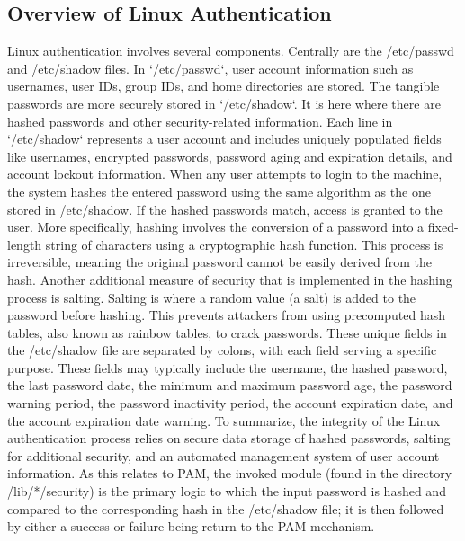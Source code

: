 \documentclass[
]{article}
\begin{document}
\begin{multicols}{2}
\section{Overview of Linux Authentication}
Linux authentication involves several components. Centrally are the /etc/passwd and /etc/shadow files. In `/etc/passwd`, user account information such as usernames, user IDs, group IDs, and home directories are stored. The tangible passwords are more securely stored in `/etc/shadow`. It is here where there are hashed passwords and other security-related information. Each line in `/etc/shadow` represents a user account and includes uniquely populated fields like usernames, encrypted passwords, password aging and expiration details, and account lockout information. When any user attempts to login to the machine, the system hashes the entered password using the same algorithm as the one stored in /etc/shadow. If the hashed passwords match, access is granted to the user. More specifically, hashing involves the conversion of a password into a fixed-length string of characters using a cryptographic hash function. This process is irreversible, meaning the original password cannot be easily derived from the hash. Another additional measure of security that is implemented in the hashing process is salting. Salting is where a random value (a salt) is added to the password before hashing. This prevents attackers from using precomputed hash tables, also known as rainbow tables, to crack passwords. These unique fields in the /etc/shadow file are separated by colons, with each field serving a specific purpose. These fields may typically include the username, the hashed password, the last password date, the minimum and maximum password age, the password warning period, the password inactivity period, the account expiration date, and the account expiration date warning. To summarize, the integrity of the Linux authentication process relies on secure data storage of hashed passwords, salting for additional security, and an automated management system of user account information. As this relates to PAM, the invoked module (found in the directory /lib/*/security) is the primary logic to which the input password is hashed and compared to the corresponding hash in the /etc/shadow file; it is then followed by either a success or failure being return to the PAM mechanism.


\end{multicols}
\end{document}
